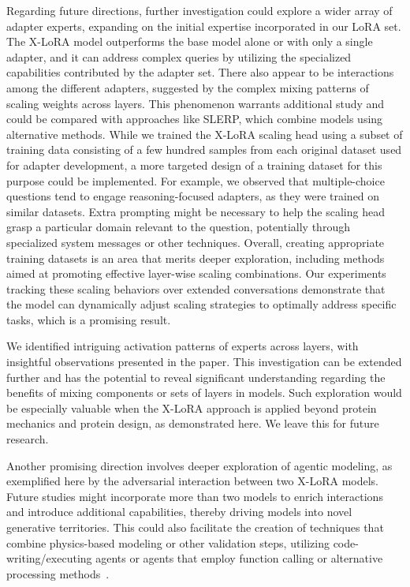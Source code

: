 Regarding future directions, further investigation could explore a wider array of adapter experts, expanding on the initial expertise incorporated in our LoRA set. The X-LoRA model outperforms the base model alone or with only a single adapter, and it can address complex queries by utilizing the specialized capabilities contributed by the adapter set. There also appear to be interactions among the different adapters, suggested by the complex mixing patterns of scaling weights across layers. This phenomenon warrants additional study and could be compared with approaches like SLERP, which combine models using alternative methods. While we trained the X-LoRA scaling head using a subset of training data consisting of a few hundred samples from each original dataset used for adapter development, a more targeted design of a training dataset for this purpose could be implemented. For example, we observed that multiple-choice questions tend to engage reasoning-focused adapters, as they were trained on similar datasets. Extra prompting might be necessary to help the scaling head grasp a particular domain relevant to the question, potentially through specialized system messages or other techniques. Overall, creating appropriate training datasets is an area that merits deeper exploration, including methods aimed at promoting effective layer-wise scaling combinations. Our experiments tracking these scaling behaviors over extended conversations demonstrate that the model can dynamically adjust scaling strategies to optimally address specific tasks, which is a promising result.

We identified intriguing activation patterns of experts across layers, with insightful observations presented in the paper. This investigation can be extended further and has the potential to reveal significant understanding regarding the benefits of mixing components or sets of layers in models. Such exploration would be especially valuable when the X-LoRA approach is applied beyond protein mechanics and protein design, as demonstrated here. We leave this for future research.

Another promising direction involves deeper exploration of agentic modeling, as exemplified here by the adversarial interaction between two X-LoRA models. Future studies might incorporate more than two models to enrich interactions and introduce additional capabilities, thereby driving models into novel generative territories. This could also facilitate the creation of techniques that combine physics-based modeling or other validation steps, utilizing code-writing/executing agents or agents that employ function calling or alternative processing methods~\cite{Ghafarollahi2024ProtAgents:Learning}.

